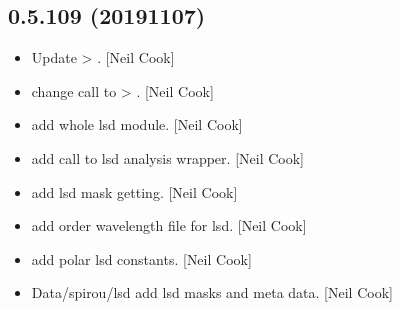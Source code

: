 \documentclass[a4paper,10pt,english]{report}
\begin{document}
\subsection{0.5.109 (2019\sphinxhyphen{}11\sphinxhyphen{}07)}
\label{\detokenize{misc/changelog:id53}}\begin{itemize}
\item {} 
Update  \textendash{}\textgreater{} . {[}Neil Cook{]}

\item {} 
 \sphinxhyphen{} change call to 
\textendash{}\textgreater{} . {[}Neil Cook{]}

\item {} 
 \sphinxhyphen{} add whole lsd module. {[}Neil Cook{]}

\item {} 
 \sphinxhyphen{} add call to lsd analysis wrapper.
{[}Neil Cook{]}

\item {} 
 \sphinxhyphen{} add lsd mask getting. {[}Neil Cook{]}

\item {} 
 \sphinxhyphen{} add order wavelength file for
lsd. {[}Neil Cook{]}

\item {} 
 \sphinxhyphen{} add polar lsd constants.
{[}Neil Cook{]}

\item {} 
Data/spirou/lsd \sphinxhyphen{} add lsd masks and meta data. {[}Neil Cook{]}

\end{itemize}
\end{document}
